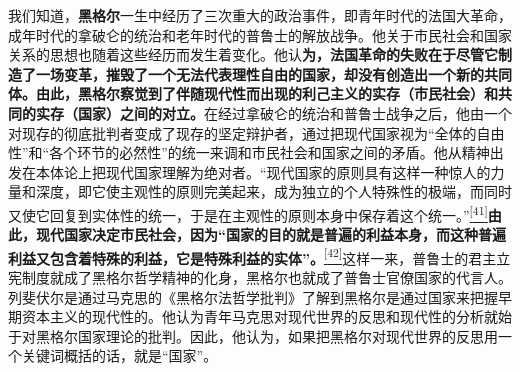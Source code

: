 \documentclass[UTF8, fontset = sourcesans, a4paper, oneside, zihao =
-4, scheme=chinese, no-math, space=true]{ctexbook}
\begin{document}
我们知道，\textbf{黑格尔}一生中经历了三次重大的政治事件，即青年时代的法国大革命，成年时代的拿破仑的统治和老年时代的普鲁士的解放战争。他关于市民社会和国家关系的思想也随着这些经历而发生着变化。他认\textbf{为，法国革命的失败在于尽管它制造了一场变革，摧毁了一个无法代表理性自由的国家，却没有创造出一个新的共同体。由此，黑格尔察觉到了伴随现代性而出现的利己主义的实存（市民社会）和共同的实存（国家）之间的对立。}在经过拿破仑的统治和普鲁士战争之后，他由一个对现存的彻底批判者变成了现存的坚定辩护者，通过把现代国家视为``全体的自由性''和``各个环节的必然性''的统一来调和市民社会和国家之间的矛盾。他从精神出发在本体论上把现代国家理解为绝对者。``现代国家的原则具有这样一种惊人的力量和深度，即它使主观性的原则完美起来，成为独立的个人特殊性的极端，而同时又使它回复到实体性的统一，于是在主观性的原则本身中保存着这个统一。''\protect\hypertarget{part0005_split_003.htmlux5cux23w41}{}{}\protect\hyperlink{part0005_split_003.htmlux5cux23m41}{\textsuperscript{{[}41{]}}}\textbf{由此，现代国家决定市民社会，因为``国家的目的就是普遍的利益本身，而这种普遍利益又包含着特殊的利益，它是特殊利益的实体''。}\protect\hypertarget{part0005_split_003.htmlux5cux23w42}{}{}\protect\hyperlink{part0005_split_003.htmlux5cux23m42}{\textsuperscript{{[}42{]}}}这样一来，普鲁士的君主立宪制度就成了黑格尔哲学精神的化身，黑格尔也就成了普鲁士官僚国家的代言人。列斐伏尔是通过马克思的《黑格尔法哲学批判》了解到黑格尔是通过国家来把握早期资本主义的现代性的。他认为青年马克思对现代世界的反思和现代性的分析就始于对黑格尔国家理论的批判。因此，他认为，如果把黑格尔对现代世界的反思用一个关键词概括的话，就是``国家''。
\end{document}
